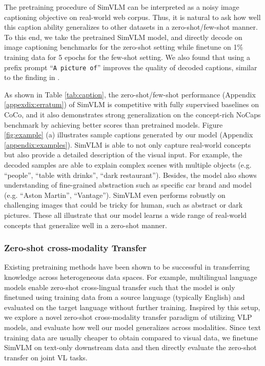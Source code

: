 The pretraining procedure of {SimVLM} can be interpreted as a noisy image captioning objective on real-world web corpus. Thus, it is natural to ask how well this caption ability generalizes to other datasets in a zero-shot/few-shot manner. To this end, we take the pretrained {SimVLM} model, and directly decode on image captioning benchmarks for the zero-shot setting while finetune on 1\% training data for 5 epochs for the few-shot setting. We also found that using a prefix prompt ``\verb+A picture of+'' improves the quality of decoded captions, similar to the finding in \cite{radford2021learning}.

As shown in Table \ref{tab:caption},
the zero-shot/few-shot performance (Appendix \ref{appexdix:erratum}) of {SimVLM} is competitive with fully supervised baselines on CoCo, and it also demonstrates strong generalization on the concept-rich NoCaps benchmark by achieving better scores than pretrained models. Figure \ref{fig:example} (a) illustrates sample captions generated by our model (Appendix \ref{appendix:examples}). {SimVLM} is able to not only capture real-world concepts but also provide a detailed description of the visual input. For example, the decoded samples are able to explain complex scenes with multiple objects (e.g. ``people'', ``table with drinks'', ``dark restaurant''). Besides, the model also shows understanding of fine-grained abstraction such as specific car brand and model (e.g. ``Aston Martin'', ``Vantage''). {SimVLM} even performs robustly on challenging images that could be tricky for human, such as abstract or dark pictures. These all illustrate that our model learns a wide range of real-world concepts that generalize well in a zero-shot manner.

\subsubsection{Zero-shot cross-modality Transfer}

Existing pretraining methods have been shown to be successful in transferring knowledge across heterogeneous data spaces. For example, multilingual language models \citep{devlin2018bert,lample2019cross} enable zero-shot cross-lingual transfer such that the model is only finetuned using training data from a source language (typically English) and evaluated on the target language without further training. Inspired by this setup, we explore a novel zero-shot cross-modality transfer paradigm of utilizing VLP models, and evaluate how well our model generalizes across modalities. Since text training data are usually cheaper to obtain compared to visual data, we finetune {SimVLM} on text-only downstream data and then directly evaluate the zero-shot transfer on joint VL tasks.

